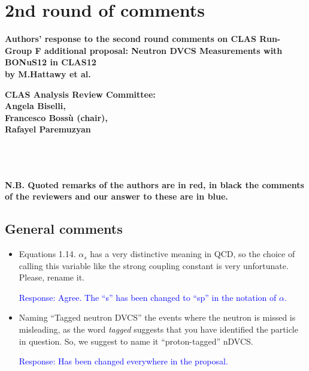 \chapter{2nd round of comments}
{\bf Authors' response to the second round comments on CLAS Run-Group F 
additional proposal: Neutron DVCS Measurements with BONuS12 in CLAS12 \\ by 
M.Hattawy et al.}
\author{Angela Biselli, Francesco Boss\`u (chair), Rafayel Paremuzyan\\CLAS 
Analysis Review Committee}

{\center \bf CLAS Analysis Review Committee:\\Angela Biselli,\\ Francesco 
Boss\`u (chair),\\ Rafayel Paremuzyan\\}


\def \rarr {\ensuremath{\rightarrow}}
~\\
~\\
~\\

{\bf N.B. Quoted remarks of the authors are in red, in black the comments of the reviewers and our answer to these are in blue.} \\ 
 
 \section*{General comments}
 \begin{itemize}
  \item Equations 1.14. $\alpha_s$ has a very distinctive meaning in QCD, so 
     the choice of calling this variable like the strong coupling constant is 
       very unfortunate. Please, rename it.
  
  \textcolor{blue}{Response: Agree. The ``s'' has been changed to ``sp'' in the 
       notation of $\alpha$. }


\item Naming ``Tagged neutron DVCS'' the events where the neutron is missed is 
   misleading, as the word \textit{tagged} suggests that you have identified 
       the particle in question. So, we suggest to name it ``proton-tagged'' 
       nDVCS.

 
  \textcolor{blue}{Response: Has been changed everywhere in the proposal.}
 
 \end{itemize}

 
 
